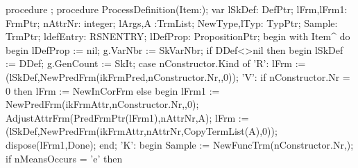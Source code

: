 \nwendcode{}\nwdocspar
\nwenddocs{}\endmoddef\nwstartdeflinemarkup{}\nwenddeflinemarkup
procedure ;
   procedure ProcessDefinition(Item:);
   var
      lSkDef: DefPtr;
      lFrm,lFrm1: FrmPtr;
      nAttrNr: integer;
      lArgs,A :TrmList;
      NewType,lTyp: TypPtr;
      Sample: TrmPtr;
      ldefEntry: RSNENTRY;
      lDefProp: PropositionPtr;
   begin
      with Item^ do
      begin
         lDefProp := nil;
         g.VarNbr := SkVarNbr;
         if DDef<>nil then
         begin
            lSkDef := DDef;
            g.GenCount := SkIt;
            case nConstructor.Kind of
               'R': lFrm := (lSkDef,NewPredFrm(ikFrmPred,nConstructor.Nr,,0));
               'V':
                  if  nConstructor.Nr = 0 then
                     lFrm := NewInCorFrm
                  else
                  begin
                     lFrm1 := NewPredFrm(ikFrmAttr,nConstructor.Nr,,0);
                     AdjustAttrFrm(PredFrmPtr(lFrm1),nAttrNr,A);
                     lFrm := (lSkDef,NewPredFrm(ikFrmAttr,nAttrNr,CopyTermList(A),0));
                     dispose(lFrm1,Done);
                  end;
               'K':
                  begin Sample := NewFuncTrm(nConstructor.Nr,);
                  if nMeansOccurs = 'e' then
